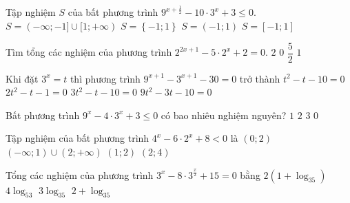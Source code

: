\begin{ex}%
	Tập nghiệm $S$ của bất phương trình $9^{x+\frac{1}{2}}-10\cdot3^x+3\le 0$.
	\choice
	{$S=(-\infty;-1]\cup[1;+\infty)$}
	{$S=\left\{-1;1\right\}$}
	{$S=\left(-1;1\right)$}
	{\True $S=\left[-1;1\right]$}
\end{ex}
\begin{ex}%
	Tìm tổng các nghiệm của phương trình $2^{2x+1}-5\cdot2^x+2=0$.
	\choice
	{$2$}
	{\True $0$}
	{$\dfrac{5}{2}$}
	{$1$}
\end{ex}
\begin{ex}%
	Khi đặt $3^x=t$ thì phương trình $9^{x+1}-3^{x+1}-30=0$ trở thành
	\choice
	{$t^2-t-10=0$}
	{$2t^2-t-1=0$}
	{\True $3t^2-t-10=0$}
	{$9t^2-3t-10=0$}
\end{ex}
\begin{ex}%
	Bất phương trình $9^x-4\cdot3^x+3\le 0$ có bao nhiêu nghiệm nguyên?
	\choice
	{$1$}
	{\True $2$}
	{$3$}
	{$0$}
\end{ex}
\begin{ex}%
	Tập nghiệm của bất phương trình $4^x-6\cdot2^x+8<0$ là
	\choice
	{$\left(0;2\right)$}
	{$\left(-\infty;1\right)\cup\left(2;+\infty\right)$}
	{\True $\left(1;2\right)$}
	{$\left(2;4\right)$}
\end{ex}
\begin{ex}%
	Tổng các nghiệm của phương trình $3^x-8\cdot3^{\tfrac{x}{2}}+15=0$ bằng
	\choice
	{\True $2\left(1+\log_35\right)$}
	{$4\log_53$}
	{$3\log_35$}
	{$2+\log_35$}
\end{ex}
